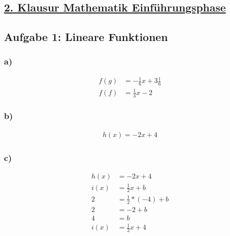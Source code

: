 \documentclass[a4paper]{article}
\begin{document}
\sffamily
{}
\setcounter{page}{1}

\begin{center}
	\section*{\underline{\textbf {2. Klausur Mathematik Einführungsphase}}}
\end{center}
\vspace*{5mm}

\subsection*{\textbf{Aufgabe 1: Lineare Funktionen}}
	\begin{minipage}{0.5\textwidth}
		\subsubsection*{a)}
			\begin{align*}
				f(g)&=-\frac{1}{6}x+3\frac{1}{6} \\
				f(f)&=\frac{1}{3}x-2
			\end{align*}
		\subsubsection*{b)}
			\begin{align*}
				h(x)=-2x+4
			\end{align*}
	\end {minipage}
	\begin {minipage}{0.5\textwidth}
		\subsubsection*{c)}
			\begin{align*}
				h(x) &= -2x + 4 \\
				i(x) &= \frac{1}{2}x + b\\
				2	 &= \frac{1}{2}	* (-4) + b\\
				2	 &= -2 + b \\
				4	 &= b\\
				i(x) &= \frac{1}{2}x + 4
			\end{align*}
	\end{minipage}
\vspace*{5mm}
\end{document}
